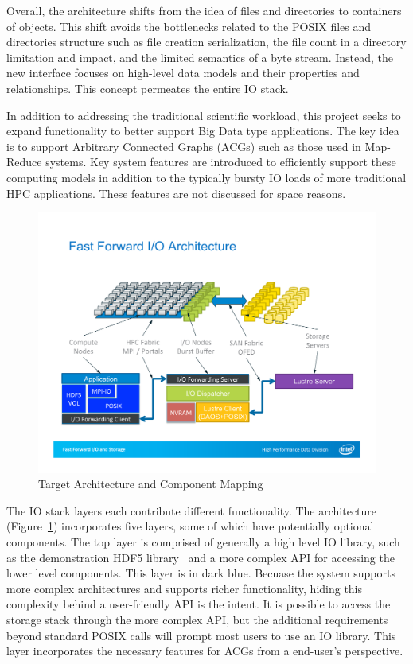 \documentclass[conference]{IEEEtran} \pdfpagewidth=8.5in
\begin{document}
Overall, the architecture shifts from the idea of files and directories to
containers of objects. This shift avoids the bottlenecks related to the POSIX
files and directories structure such as file creation serialization, the
file count in a directory limitation and impact, and the limited
semantics of a byte stream. Instead, the new interface focuses on high-level
data models and their properties and relationships. This concept permeates the
entire IO stack.

In addition to addressing the traditional scientific workload, this project
seeks to expand functionality to better support Big Data type applications. The
key idea is to support Arbitrary Connected Graphs (ACGs) such as those used in
Map-Reduce systems. Key system features are introduced to efficiently support
these computing models in addition to the typically bursty IO loads of more
traditional HPC applications. These features are not discussed for space
reasons.

\begin{figure}[htbp]
\centering
\includegraphics[width=\columnwidth]{images/arch-mapping}
\caption{Target Architecture and Component Mapping}
\label{fig:arch-mapping}
\end{figure}

The IO stack layers each contribute
different functionality.  The architecture (Figure~\ref{fig:arch-mapping})
incorporates five layers, some of which have potentially optional components.
The top layer is comprised of generally a high level IO library, such as the
demonstration HDF5 library~\cite{folk:2011:hdf5} and a more complex API for accessing the
lower level components. This layer is in dark blue. Becuase the system supports
more complex architectures and supports richer functionality, hiding this
complexity behind a user-friendly API is the intent. It is possible to 
access the storage stack through the more complex API, but the additional
requirements beyond standard POSIX calls will prompt most users to use an IO
library.  This layer incorporates the necessary features for ACGs from a
end-user's perspective.
\end{document}
